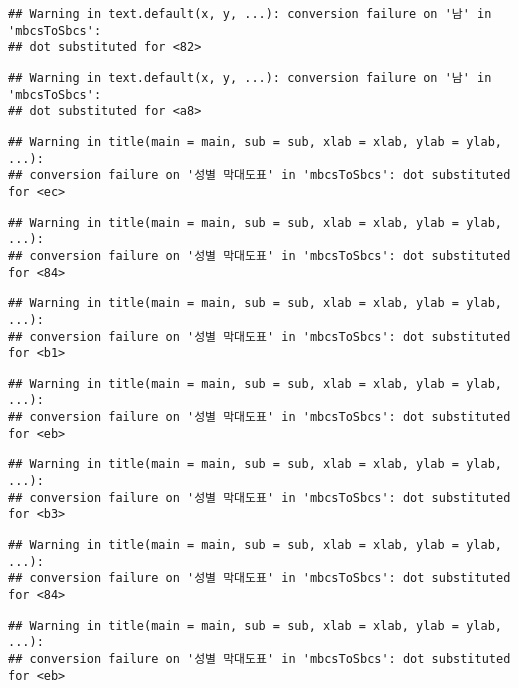 \documentclass[
]{article}
\begin{document}
\begin{verbatim}
## Warning in text.default(x, y, ...): conversion failure on '남' in 'mbcsToSbcs':
## dot substituted for <82>
\end{verbatim}

\begin{verbatim}
## Warning in text.default(x, y, ...): conversion failure on '남' in 'mbcsToSbcs':
## dot substituted for <a8>
\end{verbatim}

\begin{verbatim}
## Warning in title(main = main, sub = sub, xlab = xlab, ylab = ylab, ...):
## conversion failure on '성별 막대도표' in 'mbcsToSbcs': dot substituted for <ec>
\end{verbatim}

\begin{verbatim}
## Warning in title(main = main, sub = sub, xlab = xlab, ylab = ylab, ...):
## conversion failure on '성별 막대도표' in 'mbcsToSbcs': dot substituted for <84>
\end{verbatim}

\begin{verbatim}
## Warning in title(main = main, sub = sub, xlab = xlab, ylab = ylab, ...):
## conversion failure on '성별 막대도표' in 'mbcsToSbcs': dot substituted for <b1>
\end{verbatim}

\begin{verbatim}
## Warning in title(main = main, sub = sub, xlab = xlab, ylab = ylab, ...):
## conversion failure on '성별 막대도표' in 'mbcsToSbcs': dot substituted for <eb>
\end{verbatim}

\begin{verbatim}
## Warning in title(main = main, sub = sub, xlab = xlab, ylab = ylab, ...):
## conversion failure on '성별 막대도표' in 'mbcsToSbcs': dot substituted for <b3>
\end{verbatim}

\begin{verbatim}
## Warning in title(main = main, sub = sub, xlab = xlab, ylab = ylab, ...):
## conversion failure on '성별 막대도표' in 'mbcsToSbcs': dot substituted for <84>
\end{verbatim}

\begin{verbatim}
## Warning in title(main = main, sub = sub, xlab = xlab, ylab = ylab, ...):
## conversion failure on '성별 막대도표' in 'mbcsToSbcs': dot substituted for <eb>
\end{verbatim}
\end{document}
